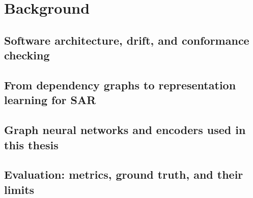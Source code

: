 \chapter{Background}

\section{Software architecture, drift, and conformance checking}

\section{From dependency graphs to representation learning for SAR}

\section{Graph neural networks and encoders used in this thesis}

\section{Evaluation: metrics, ground truth, and their limits}
